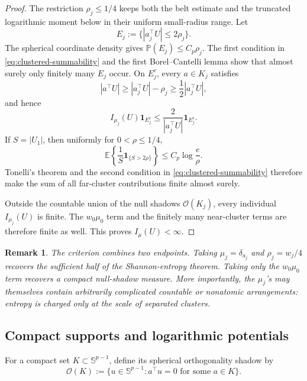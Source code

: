 \documentclass[11pt]{article}
\numberwithin{equation}{section}
\theoremstyle{thmstyleone}%
\theoremstyle{thmstyletwo}%
\newtheorem*{remark}{Remark}%
\let\cref\autoref
\newcommand{\E}{\mathbb E}
\newcommand{\Prb}{\mathbb P}
\newcommand{\sphere}{\mathbb S}
\begin{document}
\begin{proof}
The restriction \(\rho_j\leq1/4\) keeps both the belt estimate and the
truncated logarithmic moment below in their uniform small-radius range.
Let
\[
  E_j:=\{|a_j^\top U|\leq2\rho_j\}.
\]
The spherical coordinate density gives
\(\Prb(E_j)\leq C_p\rho_j\).  The first condition in
\cref{eq:clustered-summability} and the first Borel--Cantelli lemma show
that almost surely only finitely many \(E_j\) occur.  On \(E_j^c\), every
\(a\in K_j\) satisfies
\[
  |a^\top U|
  \geq |a_j^\top U|-\rho_j
  \geq\frac12|a_j^\top U|,
\]
and hence
\[
  I_{\mu_j}(U)\boldsymbol 1_{E_j^c}
  \leq
  \frac{2}{|a_j^\top U|}\boldsymbol 1_{E_j^c}.
\]
If \(S=|U_1|\), then uniformly for \(0<\rho\leq1/4\),
\[
  \E\left\{\frac1S\boldsymbol 1_{\{S>2\rho\}}\right\}
  \leq C_p\log\frac e\rho.
\]
Tonelli's theorem and the second condition in
\cref{eq:clustered-summability} therefore make the sum of all far-cluster
contributions finite almost surely.

Outside the countable union of the null shadows
\(\mathcal O(K_j)\), every individual \(I_{\mu_j}(U)\) is finite.
The \(w_0\mu_0\) term and the finitely many near-cluster terms are therefore
finite as well.  This proves \(I_\mu(U)<\infty\).
\end{proof}

\begin{remark}
The criterion combines two endpoints.  Taking
\(\mu_j=\delta_{a_j}\) and \(\rho_j=w_j/4\) recovers the sufficient half of
the Shannon-entropy theorem.  Taking only the \(w_0\mu_0\) term recovers a
compact null-shadow measure.  More importantly, the \(\mu_j\)'s may
themselves contain arbitrarily complicated countable or nonatomic
arrangements: entropy is charged only at the scale of separated clusters.
\end{remark}

\subsection{Compact supports and logarithmic potentials}

For a compact set \(K\subset\sphere^{p-1}\), define its spherical
orthogonality shadow by
\begin{equation}
  \mathcal O(K)
  :=
  \{u\in\sphere^{p-1}:a^\top u=0
    \text{ for some }a\in K\}.
  \label{eq:orthogonality-shadow}
\end{equation}
\end{document}

